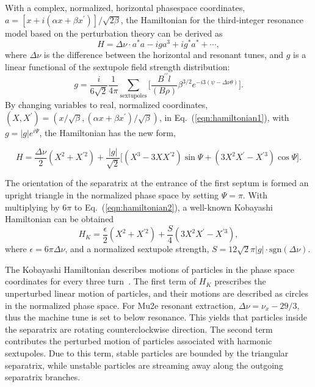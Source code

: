 \documentclass[aps,prstab,onecolumn,preprint,endfloats,11pt]{revtex4-1}
\begin{document}
With a complex, normalized, horizontal phasespace coordinates, $a = [x + i (\alpha x + \beta x^{\prime})] / \sqrt{2 \beta}$, the Hamiltonian for the third-integer resonance model based on the perturbation theory can be derived as~\cite{preliminary}
\begin{equation}
  H = \Delta \nu \cdot a^{*} a - i g a^{3} + i g^{*} a^{*} + \cdots,
\label{eqn:hamiltonian1}
\end{equation}
where $\Delta \nu$ is the difference between the horizontal and resonant tunes, and $g$ is  a linear functional of the sextupole field strength distribution:
\begin{equation*}
  g = \frac{i}{6 \sqrt{2}} \frac{1}{4 \pi} \sum_{\text{sextupoles}}
      \Bigg[
        \frac{B^{\prime\prime} l}{(B\rho)} \beta^{3/2}
        e^{-i 3(\psi - \Delta \nu \theta)}
      \Bigg].
\end{equation*}
By changing variables to real, normalized coordinates, $(X, X^{\prime}) = (x/\sqrt{\beta}, (\alpha x + \beta x^{\prime}) / \sqrt{\beta})$, in Eq.~(\ref{eqn:hamiltonian1}), with $g = |g| e^{i \Psi}$, the Hamiltonian has the new form,
\begin{widetext}
\begin{equation}
  H = \frac{\Delta \nu}{2} \left( X^{2} + X^{\prime2} \right)
    + \frac{|g|}{\sqrt{2}}
      \Big[
        \left( X^{3} - 3 X X^{\prime 2} \right) \sin{\Psi}
      + \left( 3 X^{2} X^{\prime} - X^{\prime 3} \right) \cos{\Psi}
      \Big].
\label{eqn:hamiltonian2}
\end{equation}
\end{widetext}
The orientation of the separatrix at the entrance of the first septum is formed an upright triangle in the normalized phase space by setting $\Psi = \pi$. With multiplying by $6 \pi$ to Eq.~(\ref{eqn:hamiltonian2}), a well-known Kobayashi Hamiltonian can be obtained
\begin{equation}
  H_{K} = \frac{\epsilon}{2} \left( X^{2} + X^{\prime2} \right)
    + \frac{S}{4} \left( 3 X^{2} X^{\prime} - X^{\prime 3} \right),
\label{eqn:kobayashi}
\end{equation}
where $\epsilon = 6\pi \Delta \nu$, and a normalized sextupole strength, $S = 12\sqrt{2} \pi |g| \cdot \text{sgn}(\Delta \nu)$. 

The Kobayashi Hamiltonian describes motions of particles in the phase space coordinates for every three turn~\cite{kobayashi}.
The first term of $H_{K}$ prescribes the unperturbed linear motion of particles, and their motions are described as circles in the normalized phase space. For Mu2e resonant extraction, $\Delta \nu = \nu_{x} - 29/3$, thus the machine tune is set to below resonance. This yields that particles inside the separatrix are rotating counterclockwise direction. The second term contributes the perturbed motion of particles associated with harmonic sextupoles. Due to this term, stable particles are bounded by the triangular separatrix, while unstable particles are streaming away along the outgoing separatrix branches. 
\end{document}
